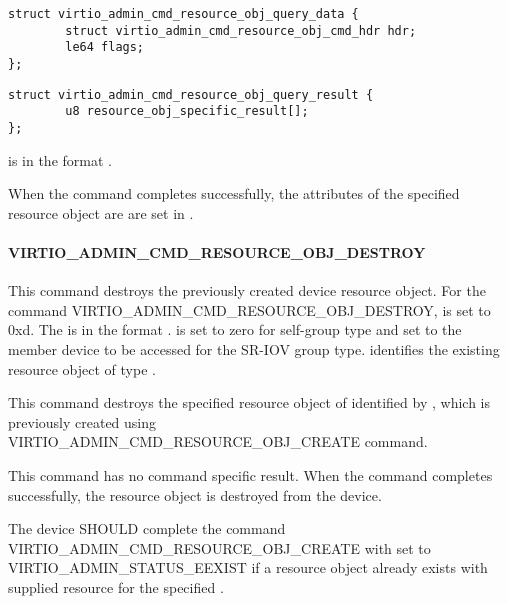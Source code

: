 \begin{lstlisting}
struct virtio_admin_cmd_resource_obj_query_data {
        struct virtio_admin_cmd_resource_obj_cmd_hdr hdr;
        le64 flags;
};
\end{lstlisting}

\begin{lstlisting}
struct virtio_admin_cmd_resource_obj_query_result {
        u8 resource_obj_specific_result[];
};
\end{lstlisting}

 is in the format
.

When the command completes successfully, the attributes of the specified
resource object are are set in .

\paragraph{VIRTIO_ADMIN_CMD_RESOURCE_OBJ_DESTROY}
\label{par:Basic Facilities of a Virtio Device / Device groups / Group administration commands / Device resource objects / VIRTIO-ADMIN-CMD-RESOURCE-OBJ-DESTROY}

This command destroys the previously created device resource object.
For the command VIRTIO_ADMIN_CMD_RESOURCE_OBJ_DESTROY,  is set to 0xd.
The  is in the format
.
 is set to zero for self-group type and set to
the member device to be accessed for the SR-IOV group type.
 identifies the existing resource object of type .

This command destroys the specified resource object of  identified
by , which is previously created using
VIRTIO_ADMIN_CMD_RESOURCE_OBJ_CREATE command.

This command has no command specific result.
When the command completes successfully, the resource object is destroyed from the device.


The device SHOULD complete the command VIRTIO_ADMIN_CMD_RESOURCE_OBJ_CREATE
with  set to VIRTIO_ADMIN_STATUS_EEXIST if a resource object already exists
with supplied resource  for the specified .

